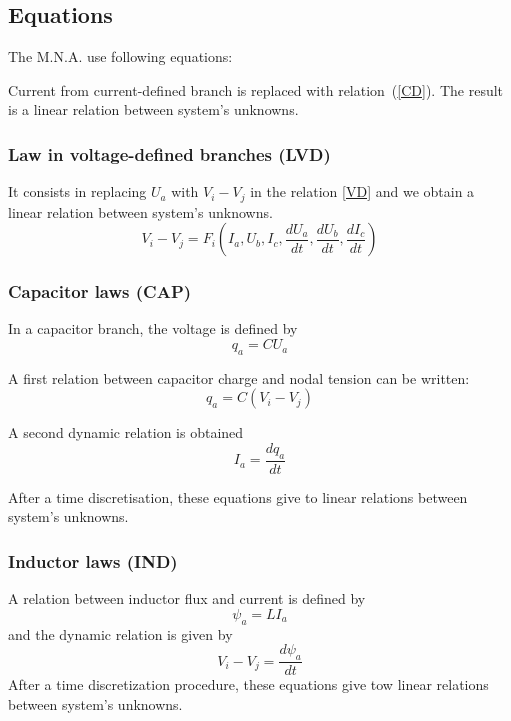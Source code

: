 \subsection{Equations}
The M.N.A. use following equations:


Current from current-defined branch is replaced with relation~(\ref{CD}). The result is a linear relation between system's unknowns.
\subsubsection{Law in voltage-defined branches (LVD)}
It consists in replacing $U_{a}$ with $V_{i}-V_{j}$ in the relation \ref{VD} and we obtain a linear relation between system's unknowns.
\[V_{i}-V_{j}=F_{i}(I_{a},U_{b},I_{c},\frac{dU_a}{dt},\frac{dU_b}{dt},\frac{dI_{c}}{dt})\]
\subsubsection{Capacitor laws (CAP)}
In a capacitor branch, the voltage is defined by 
\begin{equation}
 q_{a}=CU_{a} 
\end{equation}

A first relation between capacitor charge and nodal tension can be written:\\
\begin{equation}
 q_{a}=C(V_{i}-V_{j})\label{eq:CAP1}\tag{CAP1}
\end{equation}

A second dynamic relation is obtained
\begin{equation}
I_{a}=\frac{dq_{a}}{dt} \label{eq:CAP2}\tag{CAP2}
\end{equation}


After a time discretisation, these equations give to linear relations between system's unknowns.
\subsubsection{Inductor laws (IND)}
A relation between inductor flux and current is defined by
\begin{equation}
\psi _{a}=LI_{a}\label{eq:IND1}\tag{IND1}
\end{equation}
and the  dynamic relation is given by
\begin{equation}
  \label{eq:IND2}
   V_{i}-V_{j}=\frac{d\psi _{a}}{dt} \tag{IND2}
\end{equation}
After a time discretization procedure, these equations give tow linear relations between system's unknowns.
\newpage

